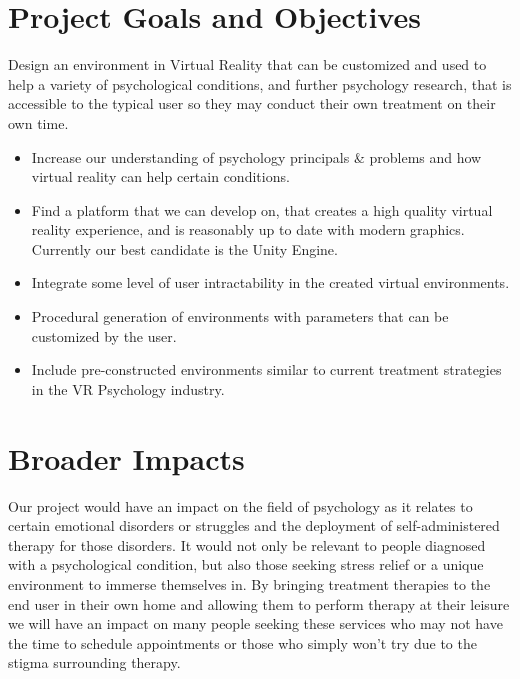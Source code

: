 \documentclass[a4paper,10pt,twoside]{article}
\begin{document}
\section{Project Goals and Objectives}
	Design an environment in Virtual Reality that can be customized and used to help a variety of psychological conditions, and further psychology research, that is accessible to the typical user so they may conduct their own treatment on their own time.
	\begin{itemize}
		\item Increase our understanding of psychology principals \& problems and how virtual reality can help certain conditions.
		\item Find a platform that we can develop on, that creates a high quality virtual reality experience, and is reasonably up to date with modern graphics. Currently our best candidate is the Unity Engine.
		\item Integrate some level of user intractability in the created virtual environments. 
		\item Procedural generation of environments with parameters that can be customized by the user. 
		\item Include pre-constructed environments similar to current treatment strategies in the VR Psychology industry.
	\end{itemize}
	\section{Broader Impacts}
	
	
	Our project would have an impact on the field of psychology as it relates to certain emotional disorders or struggles and the deployment of self-administered therapy for those disorders. It would not only be relevant to people diagnosed with a psychological condition, but also those seeking stress relief or a unique environment to immerse themselves in. By bringing treatment therapies to the end user in their own home and allowing them to perform therapy at their leisure we will have an impact on many people seeking these services who may not have the time to schedule appointments or those who simply won't try due to the stigma surrounding therapy.
	
\end{document}

